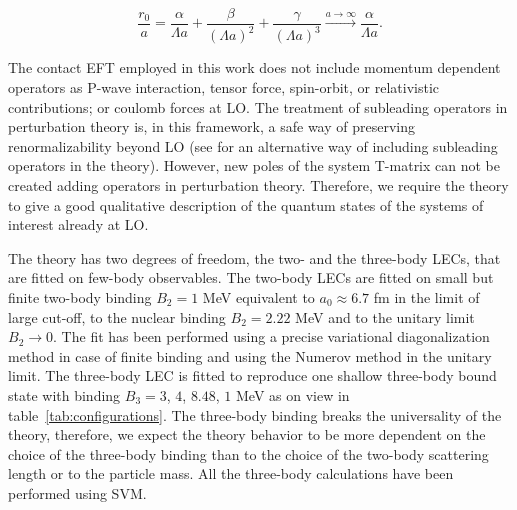 \documentclass[preprint,12pt]{elsarticle}
\newcommand{\tabref}[1]{table~\ref{#1}}
\begin{document}
\begin{equation}
    \frac{r_0}{a} = \frac{ \alpha}{\Lambda a}+ \frac{\beta}{(\Lambda a)^2}+ \frac{\gamma}{(\Lambda a)^3} \xrightarrow[]{a\rightarrow\infty} \frac{\alpha}{\Lambda a}.
    \label{eq:philips_effr}
\end{equation}


The contact EFT employed in this work does not include momentum dependent operators as P-wave interaction, tensor force, spin-orbit, or relativistic contributions; or coulomb forces at LO.
The treatment of subleading operators in perturbation theory is, in this framework, a safe way of preserving renormalizability beyond LO (see \cite{Beck:2019abp, Epelbaum:2018zli} for an alternative way of including subleading operators in the theory).
However, new poles of the system T-matrix can not be created adding operators in perturbation theory.
Therefore, we require the theory to give a good qualitative description of the quantum states of the systems of interest already at LO.

The theory has two degrees of freedom, the two- and the three-body LECs, that are fitted on few-body observables.  
The two-body LECs are fitted on small but finite two-body binding $B_2=1$ MeV equivalent to $a_0\approx6.7$ fm in the limit of large cut-off, to the nuclear binding $B_2=2.22$ MeV and to the unitary limit $B_2\rightarrow0$.
The fit has been performed using a precise variational diagonalization method in case of finite binding and using the Numerov method in the unitary limit.
The three-body LEC is fitted to reproduce one shallow three-body bound state with binding $B_3=3$, $4$, $8.48$, $1$ MeV as on view in \tabref{tab:configurations}.
The three-body binding breaks the universality of the theory, therefore, we expect the theory behavior to be more dependent on the choice of the three-body binding than to the choice of the two-body scattering length or to the particle mass.
All the three-body calculations have been performed using SVM.



\end{document}
